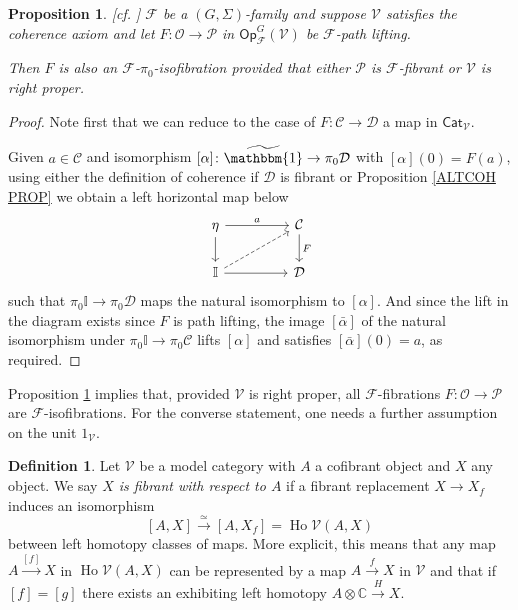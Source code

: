 \documentclass[a4paper,10pt
,draft
]{article}%
\numberwithin{equation}{section}
\numberwithin{figure}{section}
\newtheorem{proposition}[equation]{Proposition}%
\theoremstyle{definition} %
\newtheorem{definition}[equation]{Definition}%
\newcommand{\Op}{\mathsf{Op}}%
\DeclareMathOperator{\Ho}{Ho}
\newcommand{\F}{\ensuremath{\mathcal F}}
\newcommand{\V}{\ensuremath{\mathcal V}}
\renewcommand{\O}{\ensuremath{\mathcal O}}
\renewcommand{\P}{\ensuremath{\mathcal P}}
\newcommand{\1}{\ensuremath{\mathbbm 1}}%
\begin{document}
\begin{proposition}\label{ISOFIBEASY PROP}
[{cf. \cite[Props. 2.3]{Ber07b}}]
$\F$ be a $(G,\Sigma)$-family and 
suppose $\V$ satisfies the coherence axiom
and let 
$F: \O \to \P$ in $\Op^G_\F(\V)$
be $\F$-path lifting.

Then $F$ is also an $\F$-$\pi_0$-isofibration
provided that either $\mathcal{P}$ is $\F$-fibrant
or $\V$ is right proper.
\end{proposition}


\begin{proof}
Note first that we can reduce to 
the case of $F \colon \mathcal{C} \to \mathcal{D}$
a map in $\mathsf{Cat}_{\V}$.

Given $a \in \mathcal{C}$
and isomorphism $[\alpha] \colon \widetilde{\mathbbm{1}} \to \pi_0 \mathcal{D}$
with $[\alpha](0)=F(a)$,
using either the definition of coherence 
if $\mathcal{D}$ is fibrant or 
Proposition \ref{ALTCOH PROP}
we obtain a left horizontal map below 
\begin{equation}
\begin{tikzcd}[column sep = 45pt]
	\eta \ar{d} \ar{r}{a}
&
	\mathcal{C} \ar{d}{F}
\\
	\mathbb{I} \ar{r} \ar[dashed]{ru}
&
	\mathcal{D}
\end{tikzcd}
\end{equation}
such that $\pi_0 \mathbb{I} \to \pi_0\mathcal{D}$
maps the natural isomorphism to $[\alpha]$.
And since the lift in the diagram exists since $F$ is path lifting,
the image $[\bar{\alpha}]$
of the natural isomorphism
under $\pi_0 \mathbb{I} \to \pi_0\mathcal{C}$
lifts $[\alpha]$
and satisfies $[\bar{\alpha}](0) = a$, as required.
\end{proof}



Proposition \ref{ISOFIBEASY PROP}
implies that, provided $\V$ is right proper,
all $\F$-fibrations $F \colon \mathcal{O} \to \mathcal{P}$ are $\F$-isofibrations.
%
For the converse statement, 
one needs a further assumption on 
the unit $1_{\V}$.


\begin{definition}
Let $\V$ be a model category with $A$ a cofibrant object and 
$X$ any object.
We say \emph{$X$ is fibrant with respect to $A$}
if a fibrant replacement $X\to X_f$
induces an isomorphism
\[
[A,X] \xrightarrow{\simeq} [A,X_f] = \Ho \V (A,X)
\]
between left homotopy classes of maps.
More explicit, this means that any 
map $A \xrightarrow{[f]} X$ in $\Ho \V (A,X)$
can be represented by a map 
$A \xrightarrow{f} X$ in $\V$
and that if $[f]=[g]$ there exists an exhibiting left homotopy
$A \otimes \mathbb{C} \xrightarrow{H} X$. 
\end{definition}
\end{document}
